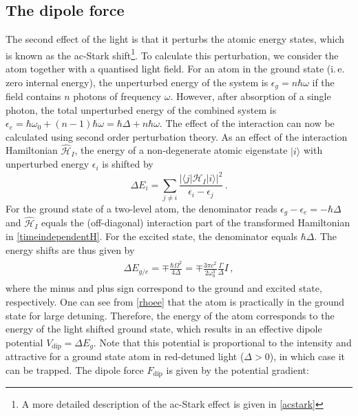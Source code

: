 \documentclass[../Thesis-IJspeert.tex]{subfiles}
\begin{document}
\subsection{The dipole force}
\label{dipoleforce}
The second effect of the light is that it perturbs the atomic energy states, which is known as the ac-Stark shift\footnote{A more detailed description of the ac-Stark effect is given in \autoref{acstark}}. To calculate this perturbation, we consider the atom together with a quantised light field. For an atom in the ground state (i.\,e. zero internal energy), the unperturbed energy of the system is $\epsilon_g=n\hbar \omega$ if the field contains $n$ photons of frequency $\omega$. However, after absorption of a single photon, the total unperturbed energy of the combined system is $\epsilon_e=\hbar \omega_0+(n-1)\hbar\omega=\hbar\Delta+n\hbar\omega$. The effect of the interaction can now be calculated using second order perturbation theory. As an effect of the interaction Hamiltonian $\hat{\mathcal{H}}_I$, the energy of a non-degenerate atomic eigenstate $\vert i \rangle$ with unperturbed energy $\epsilon_i$ is shifted by
\begin{equation}
\Delta E_i=\sum_{j\neq i}\frac{\lvert \langle j \vert\hat{\mathcal{H}}_I \vert i \rangle\rvert^2}{\epsilon_i-\epsilon_j}\,.
\end{equation}
For the ground state of a two-level atom, the denominator reads $\epsilon_g - \epsilon_e = -\hbar \Delta$ and $\hat{\mathcal{H}}_I$ equals the (off-diagonal) interaction part of the transformed Hamiltonian in \autoref{timeindependentH}. For the excited state, the denominator equals $\hbar\Delta$. The energy shifts are thus given by
\begin{align}
\begin{split}
\Delta E_{g/e}=\mp\frac{\hbar\Omega^2}{4\Delta}=\mp \frac{3\pi c^2}{2\omega_0^3}\frac{\Gamma}{\Delta}I\,,
\end{split}
\end{align}
where the minus and plus sign correspond to the ground and excited state, respectively. One can see from \autoref{rhoee} that the atom is practically in the ground state for large detuning. Therefore, the energy of the atom corresponds to the energy of the light shifted ground state, which results in an effective dipole potential $V_\text{dip} = \Delta E_g$. Note that this potential is proportional to the intensity and attractive for a ground state atom in red-detuned light ($\Delta>0$), in which case it can be trapped. The dipole force $F_\text{dip}$ is given by the potential gradient:
\end{document}
